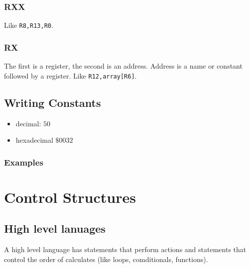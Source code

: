 \subsubsection{RXX}\label{ssub:rxx}

Like \texttt{R8,R13,R0}.

\subsubsection{RX}\label{ssub:rx}

The first is a register, the second is an address.
Address is a name or constant followed by a register.
Like \texttt{R12,array[R6]}.

\subsection{Writing Constants}\label{sub:writing_constants}

\begin{itemize}
	\item decimal: \(50\)
	\item hexadecimal \(\$0032\)
\end{itemize}

\subsubsection{Examples}\label{ssub:examples}


\section{Control Structures}\label{sec:control_structures}

\subsection{High level lanuages}\label{sub:high_level_lanuages}

A high level language has statements that perform actions and statements that control the order of calculates (like loops, comditionals, functions).

